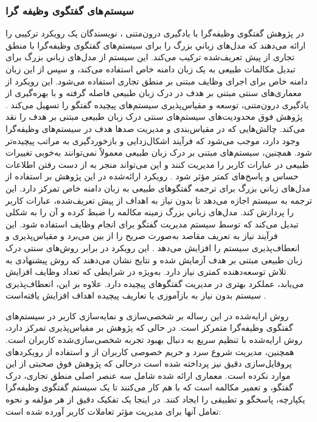 \subsubsection{سیستم های گفتگوی وظیفه گرا}
در پژوهش گفتگوی وظیفه‌گرا با یادگیری درون‌متنی%
\cite{bocklisch2024task}
، نویسندگان یک رویکرد ترکیبی را ارائه می‌دهند که مدل‌های زباني بزرگ را برای سیستم‌های گفتگوی وظیفه‌گرا با 
منطق تجاری%
 از پیش‌ تعریف‌شده ترکیب می‌کند. این سیستم از مدل‌های زباني بزرگ برای تبدیل مکالمات طبیعی به یک  
زبان دامنه خاص%
 استفاده می‌کند، و سپس از این زبان دامنه خاص برای اجرای وظایف مبتنی بر منطق تجاری استفاده می‌شود. این رویکرد از معماری‌های سنتی مبتنی بر هدف در درک زبان طبیعی فاصله گرفته و با بهره‌گیری از یادگیری درون‌متنی، توسعه و مقیاس‌پذیری سیستم‌های پیچیده گفتگو را تسهیل می‌کند .
\newline
پژوهش فوق محدودیت‌های سیستم‌های سنتی درک زبان طبیعی مبتنی بر هدف را نقد می‌کند. چالش‌هایی که در مقیاس‌بندی و مدیریت صدها هدف در سیستم‌های وظیفه‌گرا وجود دارد، موجب می‌شود که فرآیند اشکال‌زدایی و بازخوردگیری به مراتب پیچیده‌تر شود. همچنین، سیستم‌های مبتنی بر درک زبان طبیعی معمولاً نمی‌توانند به‌خوبی تغییرات طبیعی در عبارات کاربر را مدیریت کنند و این می‌تواند منجر به از دست رفتن اطلاعات حساس و پاسخ‌های کمتر مؤثر شود .
\newline
رویکرد ارائه‌شده در این پژوهش بر استفاده از مدل‌های زباني بزرگ برای ترجمه گفتگوهای طبیعی به زبان دامنه خاص تمرکز دارد. این ترجمه به سیستم اجازه می‌دهد تا بدون نیاز به اهداف از پیش‌ تعریف‌شده، عبارات کاربر را پردازش کند. مدل‌های زباني بزرگ زمینه مکالمه را ضبط کرده و آن را به شکلی تبدیل می‌کند که توسط سیستم مدیریت گفتگو برای انجام وظایف استفاده شود. این فرآیند نیاز به تعریف مقاصد به‌صورت صریح را از بین می‌برد و مقیاس‌پذیری و انعطاف‌پذیری سیستم را افزایش می‌دهد .
\newline
این رویکرد در برابر روش‌های سنتی درک زبان طبیعی مبتنی بر هدف آزمایش شده و نتایج نشان می‌دهند که روش پیشنهادی به تلاش توسعه‌دهنده کمتری نیاز دارد. به‌ویژه در شرایطی که تعداد وظایف افزایش می‌یابد، عملکرد بهتری در مدیریت گفتگوهای پیچیده دارد. علاوه بر این، انعطاف‌پذیری سیستم بدون نیاز به بازآموزی یا تعاریف پیچیده اهداف افزایش یافته‌است .

روش ارایه‌شده در این رساله بر شخصی‌سازی و نمایه‌سازی کاربر در سیستم‌های گفتگوی وظیفه‌گرا متمرکز است. در حالی که پژوهش%
\cite{bocklisch2024task}
 بر مقیاس‌پذیری تمرکز دارد، روش ارايه‌شده با تنظیم سریع به دنبال بهبود تجربه شخصی‌سازی‌شده کاربران است. همچنین، مدیریت شروع سرد و حریم خصوصی کاربران از و استفاده از رویکردهای پروفایل‌سازی دقیق نیز پرداخته شده است درحالی که پژوهش فوق صحبتی از این موارد نکرده است.
\newline
معماری ارائه شده شامل سه عنصر اصلی منطق تجاری، درک گفتگو، و تعمیر مکالمه است که با هم کار می‌کنند تا یک سیستم گفتگوی وظیفه‌گرا یکپارچه، پاسخگو و تطبیقی ​​را ایجاد کنند. در اینجا یک تفکیک دقیق از هر مؤلفه و نحوه تعامل آنها برای مدیریت مؤثر تعاملات کاربر آورده شده است:

